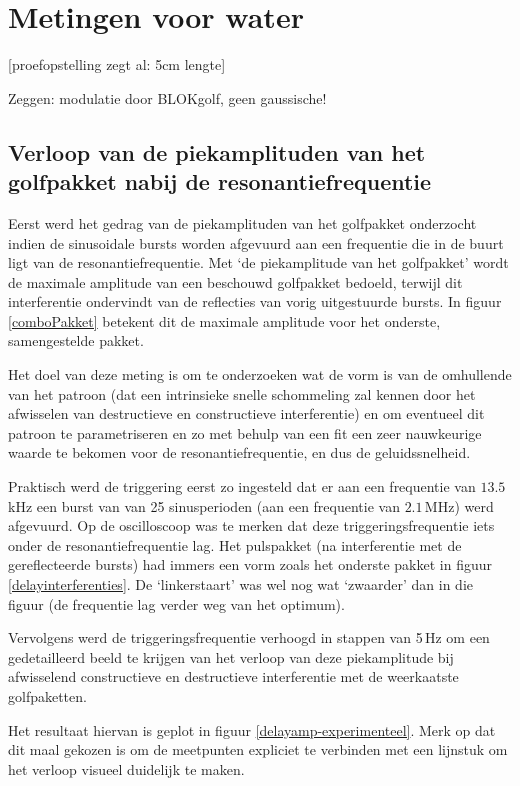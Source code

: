 \section{Metingen voor water}
[proefopstelling zegt al: 5cm lengte]

Zeggen: modulatie door BLOKgolf, geen gaussische!

\subsection{Verloop van de piekamplituden van het golfpakket nabij de 
resonantiefrequentie}
Eerst werd het gedrag van de piekamplituden van het golfpakket onderzocht 
indien de sinusoidale bursts worden afgevuurd aan een frequentie die in de 
buurt ligt van de resonantiefrequentie. Met `de piekamplitude van het 
golfpakket' wordt de maximale amplitude van een beschouwd golfpakket 
bedoeld, terwijl dit interferentie ondervindt van de reflecties van vorig 
uitgestuurde bursts. In figuur \ref{comboPakket} betekent dit de maximale 
amplitude voor het onderste, samengestelde pakket.

Het doel van deze meting is om te onderzoeken wat de vorm is van de 
omhullende van het patroon (dat een intrinsieke snelle schommeling zal 
kennen door het afwisselen van destructieve en constructieve interferentie) 
en om eventueel dit patroon te parametriseren en zo met behulp van een fit 
een zeer nauwkeurige waarde te bekomen voor de resonantiefrequentie, en dus 
de geluidssnelheid.

Praktisch werd de triggering eerst zo ingesteld dat er aan een frequentie 
van $13.5$\,kHz een burst van van 25 sinusperioden (aan een frequentie van 
$2.1$\,MHz) werd afgevuurd. Op de oscilloscoop was te merken dat deze 
triggeringsfrequentie iets onder de resonantiefrequentie lag. Het 
pulspakket (na interferentie met de gereflecteerde bursts) had immers een 
vorm zoals het onderste pakket in figuur \ref{delayinterferenties}. De 
`linkerstaart' was wel nog wat `zwaarder' dan in die figuur (de frequentie 
lag verder weg van het optimum).

Vervolgens werd de triggeringsfrequentie verhoogd in stappen van 5\,Hz om 
een gedetailleerd beeld te krijgen van het verloop van deze piekamplitude 
bij afwisselend constructieve en destructieve interferentie met de 
weerkaatste golfpaketten.

Het resultaat hiervan is geplot in figuur \ref{delayamp-experimenteel}.  
Merk op dat dit maal gekozen is om de meetpunten expliciet te verbinden met 
een lijnstuk om het verloop visueel duidelijk te maken.

